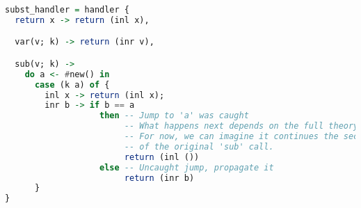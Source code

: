 \documentclass{article}
\begin{document}
\begin{lstlisting}[language=Haskell, basicstyle=\small\ttfamily]
subst_handler = handler {
  return x -> return (inl x),

  var(v; k) -> return (inr v),

  sub(v; k) ->
    do a <- #new() in
      case (k a) of {
        inl x -> return (inl x);
        inr b -> if b == a
                   then -- Jump to 'a' was caught
                        -- What happens next depends on the full theory
                        -- For now, we can imagine it continues the second branch
                        -- of the original 'sub' call.
                        return (inl ()) 
                   else -- Uncaught jump, propagate it
                        return (inr b)
      }
}
\end{lstlisting}
\end{document}
